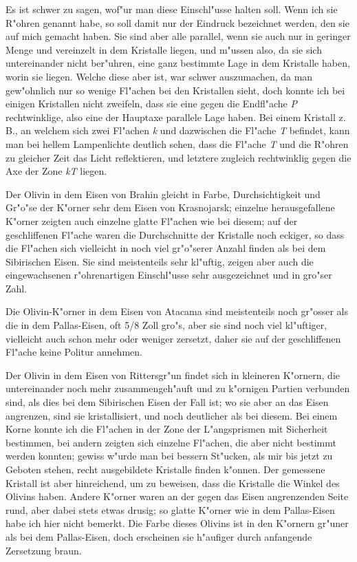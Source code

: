 \documentclass[a4paper, 11pt, oneside, german]{article}
\begin{document}
Es ist schwer zu sagen, wof"ur man diese Einschl"usse halten soll. Wenn ich sie R"ohren genannt habe, so soll damit nur der Eindruck bezeichnet werden, den sie auf mich gemacht haben. Sie sind aber alle parallel, wenn sie auch nur in geringer Menge und vereinzelt in dem Kristalle liegen, und m"ussen also, da sie sich untereinander nicht ber"uhren, eine ganz bestimmte Lage in dem Kristalle haben, worin sie liegen. Welche diese aber ist, war schwer auszumachen, da man gew"ohnlich nur so wenige Fl"achen bei den Kristallen sieht, doch konnte ich bei einigen Kristallen nicht zweifeln, dass sie eine gegen die Endfl"ache \emph{P} rechtwinklige, also eine der Hauptaxe parallele Lage haben. Bei einem Kristall z. B., an welchem sich zwei Fl"achen \emph{k} und dazwischen die Fl"ache \emph{T} befindet, kann man bei hellem Lampenlichte deutlich sehen, dass die Fl"ache \emph{T} und die R"ohren zu gleicher Zeit das Licht reflektieren, und letztere zugleich rechtwinklig gegen die Axe der Zone \emph{kT} liegen.

Der Olivin in dem Eisen von Brahin gleicht in Farbe, Durchsichtigkeit und Gr"o"se der K"orner sehr dem Eisen von Krasnojarsk; einzelne herausgefallene K"orner zeigten auch einzelne glatte Fl"achen wie bei diesem; auf der geschliffenen Fl"ache waren die Durchschnitte der Kristalle noch eckiger, so dass die Fl"achen sich vielleicht in noch viel gr"o"serer Anzahl finden als bei dem Sibirischen Eisen. Sie sind meistenteils sehr kl"uftig, zeigen aber auch die eingewachsenen r"ohrenartigen Einschl"usse sehr ausgezeichnet und in gro"ser Zahl.

Die Olivin-K"orner in dem Eisen von Atacama sind meistenteils noch gr"osser als die in dem Pallas-Eisen, oft 5/8 Zoll gro"s, aber sie sind noch viel kl"uftiger, vielleicht auch schon mehr oder weniger zersetzt, daher sie auf der geschliffenen Fl"ache keine Politur annehmen.

Der Olivin in dem Eisen von Rittersgr"un findet sich in kleineren K"ornern, die untereinander noch mehr zusammengeh"auft und zu k"ornigen Partien verbunden sind, als dies bei dem Sibirischen Eisen der Fall ist; wo sie aber an das Eisen angrenzen, sind sie kristallisiert, und noch deutlicher als bei diesem. Bei einem Korne konnte ich die Fl"achen in der Zone der L"angsprismen mit Sicherheit bestimmen, bei andern zeigten sich einzelne Fl"achen, die aber nicht bestimmt werden konnten; gewiss w"urde man bei bessern St"ucken, als mir bis jetzt zu Geboten stehen, recht ausgebildete Kristalle finden k"onnen. Der gemessene Kristall ist aber hinreichend, um zu beweisen, dass die Kristalle die Winkel des Olivins haben. Andere K"orner waren an der gegen das Eisen angrenzenden Seite rund, aber dabei stets etwas drusig; so glatte K"orner wie in dem Pallas-Eisen habe ich hier nicht bemerkt. Die Farbe dieses Olivins ist in den K"ornern gr"uner als bei dem Pallas-Eisen, doch erscheinen sie h"aufiger durch anfangende Zersetzung braun.
\end{document}
